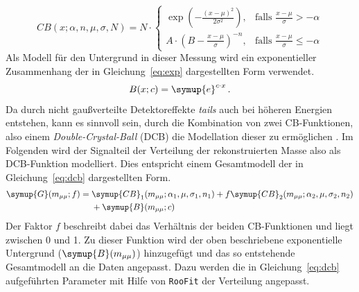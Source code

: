%
\begin{equation}
  {\displaystyle CB(x;\alpha ,n,{\mu},\sigma,N)=N\cdot {\begin{cases}\exp \left(-{\frac {(x-{\mu})^{2}}{2\sigma ^{2}}}\right),&{\mbox{falls }}{\frac {x-{\mu}}{\sigma }}>-\alpha \\A\cdot \left(B-{\frac {x-{\mu}}{\sigma }}\right)^{-n},&{\mbox{falls }}{\frac {x-{\mu}}{\sigma }}\leqslant -\alpha \end{cases}}}
  \label{eq:cb}
\end{equation}
%
Als Modell für den Untergrund in dieser Messung wird ein exponentieller Zusammenhang der in Gleichung~\ref{eq:exp} dargestellten Form verwendet.
%
\begin{equation}
  B(x; c)= \symup{e}^{c\cdot x} \, .
  \label{eq:exp}
\end{equation}
%
Da durch nicht gaußverteilte Detektoreffekte \textit{tails} auch bei höheren Energien entstehen, kann es sinnvoll sein, durch die Kombination von zwei CB-Funktionen, also einem \textit{Double-Crystal-Ball} (DCB) die Modellation dieser zu ermöglichen \cite{ipatia}.
Im Folgenden wird der Signalteil der Verteilung der rekonstruierten Masse also als DCB-Funktion modelliert. Dies entspricht einem Gesamtmodell der in Gleichung~\ref{eq:dcb} dargestellten Form.
%
\begin{equation}
  \begin{split}
  \symup{G}(m_{\mu\mu}; f)={}&\symup{CB}_1(m_{\mu\mu};\alpha_1,\mu,\sigma_1,n_1) + f\symup{CB}_2(m_{\mu\mu};\alpha_2,\mu,\sigma_2,n_2)\\ &+ \symup{B}(m_{\mu\mu};c)
  \end{split}
  \label{eq:dcb}
\end{equation}
%
Der Faktor $f$ beschreibt dabei das Verhältnis der beiden CB-Funktionen und liegt zwischen 0 und 1. Zu dieser Funktion wird der oben beschriebene exponentielle Untergrund ($\symup{B}(m_{\mu\mu})$) hinzugefügt und das so entstehende Gesamtmodell an die Daten angepasst. Dazu werden die in Gleichung~\eqref{eq:dcb} aufgeführten Parameter mit Hilfe von \texttt{RooFit} der Verteilung angepasst.
%
%
